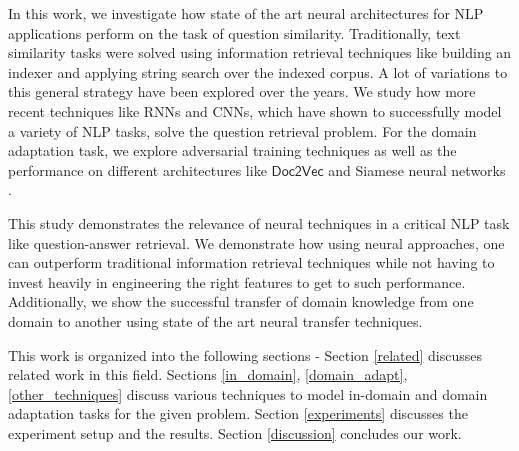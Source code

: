 \documentclass{sigkddExp}
\begin{document}
In this work, we investigate how state of the art neural architectures for NLP applications perform on the task of question similarity. Traditionally, text similarity tasks were solved using information retrieval techniques like building an indexer and applying string search over the indexed corpus. A lot of variations to this general strategy have been explored over the years. We study how more recent techniques like RNNs and CNNs, which have shown to successfully model a variety of NLP tasks, solve the question retrieval problem. For the domain adaptation task, we explore adversarial training techniques \cite{ganin2015unsupervised, lei2015semi} as well as the performance on different architectures like $\textsf{Doc2Vec}$ \cite{doc2vec1} and Siamese neural networks \cite{siamese}.

This study demonstrates the relevance of neural techniques in a critical NLP task like question-answer retrieval. We demonstrate how using neural approaches, one can outperform traditional information retrieval techniques while not having to invest heavily in engineering the right features to get to such performance. Additionally, we show the successful transfer of domain knowledge from one domain to another using state of the art neural transfer techniques.

This work is organized into the following sections - Section \ref{related} discusses related work in this field. Sections \ref{in_domain}, \ref{domain_adapt},  \ref{other_techniques} discuss various techniques to model in-domain and domain adaptation tasks for the given problem. Section \ref{experiments} discusses the experiment setup and the results. Section \ref{discussion} concludes our work.
\end{document}
